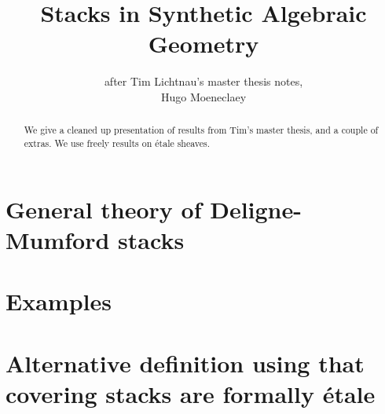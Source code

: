 \documentclass{../util/zariski}
\title{Stacks in Synthetic Algebraic Geometry}
\author{after Tim Lichtnau's master thesis notes,\\
Hugo Moeneclaey}
\begin{document}
\maketitle

\begin{abstract}
We give a cleaned up presentation of results from Tim's master thesis, and a couple of extras. We use freely results on \'etale sheaves.
\end{abstract}


\tableofcontents

\section{General theory of Deligne-Mumford stacks}


\section{Examples}


\section{Alternative definition using that covering stacks are formally \'etale}


\printindex

\printbibliography
\end{document}
